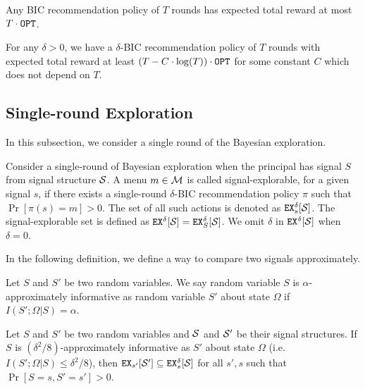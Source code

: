 \begin{claim}
Any BIC recommendation policy of $T$ rounds has expected total reward at most $T \cdot\OPT$.  
\end{claim}

\begin{theorem}
\label{thm:private_nocc}
For any $\delta > 0$, we have a $\delta$-BIC recommendation policy of $T$ rounds with expected total reward at least $\left(T - C\cdot \log(T) \right) \cdot \OPT$ for some constant $C$ which does not depend on $T$. 
\end{theorem}


\subsection{Single-round Exploration}
\label{sec:private_single}

In this subsection, we consider a single round of the Bayesian exploration. 

\begin{definition}
Consider a single-round of Bayesian exploration when the principal has signal $S$ from signal structure $\S$. A menu $m \in \M$ is called signal-explorable, for a given signal $s$, if there exists a single-round $\delta$-BIC recommendation policy $\pi$ such that $\Pr[\pi(s) = m] > 0$. The set of all such actions is denoted as $\EX^{\delta}_s[\S]$. The signal-explorable set is defined as $\EX^{\delta}[\S] = \EX^{\delta}_S[\S]$. We omit $\delta$ in $\EX^{\delta}[\S]$ when $\delta = 0$. 
\end{definition}

In the following definition, we define a way to compare two signals approximately. 
\begin{definition}
Let $S$ and $S'$ be two random variables. We say random variable $S$ is $\alpha$-approximately informative as random variable $S'$ about state $\Omega$ if $I(S' ; \Omega|S) = \alpha$. 
\end{definition}

\begin{lemma} 
\label{lem:ainfomono}
Let $S$ and $S'$ be two random variables and $\S$ and $\S'$ be their signal structures. If $S$ is $(\delta^2/8)$-approximately informative as $S'$ about state $\Omega$ (i.e. $I(S' ; \Omega|S) \leq \delta^2/8$), then $\EX_{s'}[\S'] \subseteq \EX^{\delta}_s[\S]$  for all $s' ,s$ such that $\Pr[S= s, S'= s'] > 0$.
\end{lemma}

